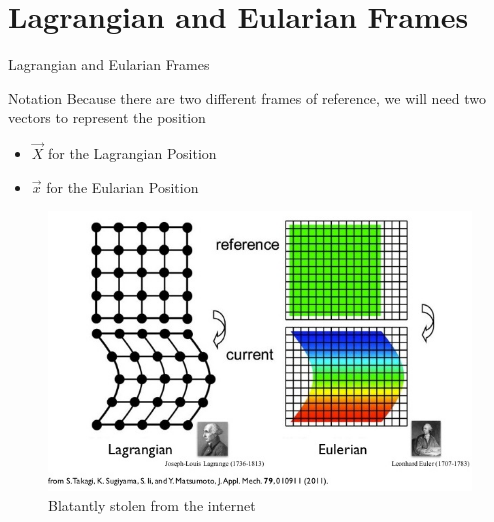 \documentclass{beamer}
\begin{document}
\section{Lagrangian and Eularian Frames}
\begin{frame}{Lagrangian and Eularian Frames}
\begin{block}{Notation}
	Because there are two different frames of reference, we will need
	two vectors to represent the position 
	\begin{itemize}
		\item $\vec{X}$ for the Lagrangian Position
		\item $\vec{x}$ for the Eularian Position
	\end{itemize}		
\end{block}
\begin{figure}[!ht]
	\includegraphics[scale=0.5]{LE2}
	\caption{Blatantly stolen from the internet}
	\label{fig:LE}
\end{figure}
\end{frame}
\end{document}
